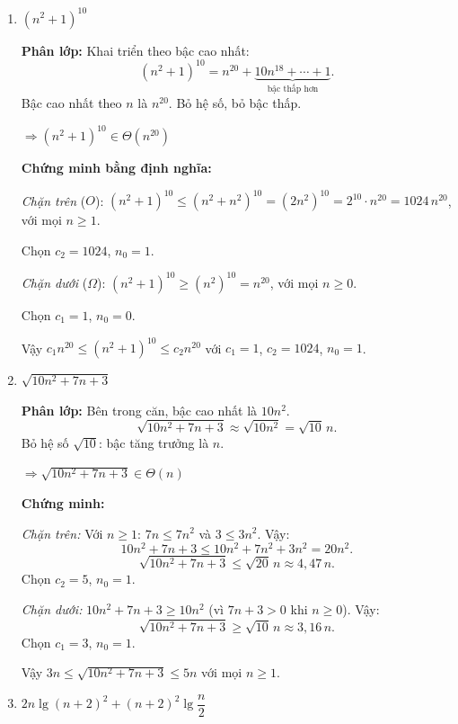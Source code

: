 \documentclass[12pt,a4paper]{article}
\begin{document}
\begin{enumerate}[label=\textbf{\alph*.}]

  \item $(n^2 + 1)^{10}$

  \textbf{Phân lớp:} Khai triển theo bậc cao nhất:
  \[
    (n^2 + 1)^{10} = n^{20} + \underbrace{10n^{18} + \cdots + 1}_{\text{bậc thấp hơn}}.
  \]
  Bậc cao nhất theo $n$ là $n^{20}$. Bỏ hệ số, bỏ bậc thấp.

  $\Longrightarrow \boxed{(n^2+1)^{10} \in \Theta(n^{20})}$

  \textbf{Chứng minh bằng định nghĩa:}

  \textit{Chặn trên} ($O$): $(n^2+1)^{10} \leq (n^2 + n^2)^{10} = (2n^2)^{10} = 2^{10} \cdot n^{20} = 1024\,n^{20}$,
  với mọi $n \geq 1$.

  Chọn $c_2 = 1024$, $n_0 = 1$.

  \textit{Chặn dưới} ($\Omega$): $(n^2+1)^{10} \geq (n^2)^{10} = n^{20}$, với mọi $n \geq 0$.

  Chọn $c_1 = 1$, $n_0 = 0$.

  Vậy $c_1 n^{20} \leq (n^2+1)^{10} \leq c_2 n^{20}$ với $c_1=1$, $c_2=1024$, $n_0=1$. \checkmark

  \bigskip

  \item $\sqrt{10n^2 + 7n + 3}$

  \textbf{Phân lớp:} Bên trong căn, bậc cao nhất là $10n^2$.
  \[
    \sqrt{10n^2 + 7n + 3} \approx \sqrt{10n^2} = \sqrt{10}\,n.
  \]
  Bỏ hệ số $\sqrt{10}$: bậc tăng trưởng là $n$.

  $\Longrightarrow \boxed{\sqrt{10n^2 + 7n + 3} \in \Theta(n)}$

  \textbf{Chứng minh:}

  \textit{Chặn trên:} Với $n \geq 1$: $7n \leq 7n^2$ và $3 \leq 3n^2$. Vậy:
  \[
    10n^2 + 7n + 3 \leq 10n^2 + 7n^2 + 3n^2 = 20n^2.
  \]
  \[
    \sqrt{10n^2 + 7n + 3} \leq \sqrt{20}\,n \approx 4{,}47\,n.
  \]
  Chọn $c_2 = 5$, $n_0 = 1$.

  \textit{Chặn dưới:} $10n^2 + 7n + 3 \geq 10n^2$ (vì $7n + 3 > 0$ khi $n \geq 0$). Vậy:
  \[
    \sqrt{10n^2 + 7n + 3} \geq \sqrt{10}\,n \approx 3{,}16\,n.
  \]
  Chọn $c_1 = 3$, $n_0 = 1$.

  Vậy $3n \leq \sqrt{10n^2+7n+3} \leq 5n$ với mọi $n \geq 1$. \checkmark

  \bigskip

  \item $2n\lg(n+2)^2 + (n+2)^2 \lg\dfrac{n}{2}$


\end{enumerate}
\end{document}
